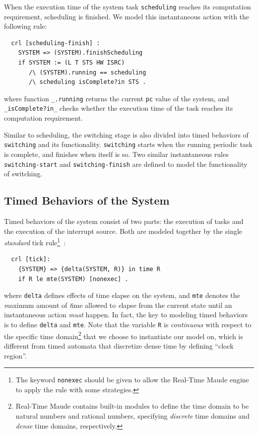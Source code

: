 \documentclass[12pt,onecolumn]{IEEEtranTIE}
\begin{document}
When the execution time of the system task \verb|scheduling| reaches
its computation requirement, scheduling is finished. We model this
instantaneous action with the following rule:
\begin{verbatim}
  crl [scheduling-finish] :
    SYSTEM => (SYSTEM).finishScheduling
    if SYSTEM := (L T STS HW ISRC) 
       /\ (SYSTEM).running == scheduling 
       /\ scheduling isComplete?in STS .
\end{verbatim}
where function \verb|_.running| returns the current \verb|pc| value of
the system, and \verb|_isComplete?in_| checks whether the execution
time of the task reaches its computation requirement.  

Similar to scheduling, the switching stage is also divided into timed
behaviors of \verb|switching| and its functionality. \verb|switching|
starts when the running periodic task is complete, and finishes when
itself is so. Two similar instantaneous rules \verb|switching-start|
and \verb|switching-finish| are defined to model the functionality of
switching. 


\subsection{Timed Behaviors of the System}
\label{ss:timedbehavior}
Timed behaviors of the system consist of two parts: the execution of
tasks and the execution of the interrupt source. Both are modeled
together by the  single \emph{standard} tick
rule\footnote{The keyword \texttt{nonexec} should be given to allow
  the Real-Time Maude engine to apply the rule with some
  strategies.}~\cite{DBLP:journals/entcs/OlveczkyM07a}:
\begin{verbatim}
  crl [tick]:
    {SYSTEM} => {delta(SYSTEM, R)} in time R 
    if R le mte(SYSTEM) [nonexec] .
\end{verbatim}
where \verb|delta| defines effects of time elapse on the system, and
\verb|mte| denotes the \emph{m}aximum amount of \emph{t}ime allowed to
\emph{e}lapse from the current state until an instantaneous action
\emph{must} happen. In fact, the key to modeling timed behaviors is to
define \verb|delta| and \verb|mte|. Note that the variable \verb|R| is
\emph{continuous} with respect to the specific time
domain\footnote{Real-Time Maude contains built-in modules to define
  the time domain to be natural numbers and rational numbers,
  specifying \emph{discrete} time domains and \emph{dense} time
  domains, respectively.}  that we choose to instantiate our model on,
which is different from timed automata that discretize dense time by
defining ``clock region''.
\end{document}
